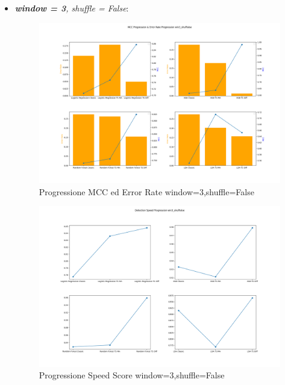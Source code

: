 \begin{itemize}
    \newpage
    \item \textit{\textbf{window = 3}, shuffle = False}:
    \begin{figure}[H]
    \centering
    \includegraphics[width=0.94\linewidth]{MCC_Progression_win3_shufFalse.png}
    \caption{Progressione MCC ed Error Rate window=3,shuffle=False}
    \label{fig:enter-label}
    \end{figure}
    \begin{figure}[H]
    \centering
    \includegraphics[width=0.94\linewidth]{Speed_Progression_win3_shufFalse.png}
    \caption{Progressione Speed Score window=3,shuffle=False}
    \label{fig:enter-label}
    \end{figure}


\end{itemize}
